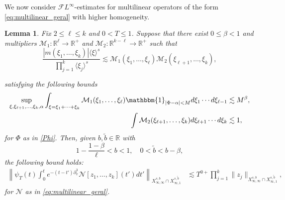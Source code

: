 \documentclass[a4paper,
11pt,  reqno]{amsart}
\newcommand{\jap}[1]{\langle #1 \rangle}
\newcommand{\5}{\textup{V}}
\newcommand{\noi}{\noindent}
\newcommand{\FL}{\mathcal{F} L}
\newcommand{\les}{\lesssim}
\newcommand{\wt}{\widetilde}
\newtheorem{lemma}[theorem]{Lemma}
\theoremstyle{remark}
\newcommand{\R}{\mathbb{R}}
\renewcommand{\l}{\ell}
\numberwithin{equation}{section}
\numberwithin{theorem}{section}
\newcommand{\Ncal}{\mathcal{N}}
\begin{document}
        
		We now consider $\FL^{\infty}$-estimates for multilinear operators of the form \eqref{eq:multilinear_geral} with higher homogeneity.
		
		\begin{lemma}\label{lem:reduction_fre_kge3}
			Fix $2\le \ell\le k$ and $0<T \le 1$. Suppose that there exist $0\le \beta<1$ and multipliers $\mathcal{M}_1:\R^\l \to \R^+$ and $\mathcal{M}_2:\R^{k-\ell}\to \R^+$ such that
			\begin{equation}
				\frac{|m(\xi_1, \ldots, \xi_k)|\jap{\xi}^s}{\prod_{j=1}^k\jap{\xi_j}^s} \lesssim \mathcal{M}_1(\xi_1,\dots, \xi_{\l})\mathcal{M}_2(\xi_{\ell+1},\dots, \xi_{{k}}),
			\end{equation}
            

            \noi 
            satisfying the following bounds
            \begin{align}
                \sup_{\xi, \xi_{\ell+1},\dots , \xi_{k},\alpha} \int_{\xi=\xi_1 + \cdots + \xi_k} \mathcal{M}_1(\xi_1,\dots,\xi_\l) \mathbbm{1}_{|\Phi-\alpha|<M} d\xi_1\cdots d\xi_{\ell-1} &
                \lesssim  
                M^\beta
                 \label{fre_kge3}, 
                 \\
                 \int \mathcal{M}_2(\xi_{\ell+1},\ldots, \xi_{{k}}) d\xi_{\ell+1}\cdots d\xi_k
                &
                \les 1,
                \label{fre_kge32}
            \end{align}
            for $\Phi$ as in \eqref{Phi}. 
            Then, given $b,\wt b\in \R$ with
            $$
            1-\frac{1-\beta}{\ell}<b<1,\quad 0<\wt{b}<b-\beta, 
            $$
            the following  bound holds:
			\begin{align}\label{frek}
				\left\|\psi_T (t)\int_0^te^{-(t-t')\partial_x^3}\Ncal[z_1,\dots, z_k](t')dt' \right\|_{X^{s,b}_{\infty, \infty}\cap X^{s,\wt{b}}_{\infty, 1}} & \les T^{0+}\prod_{j=1}^k\|z_j\|_{X^{s,b}_{\infty, \infty} \cap X^{s,\wt{b}}_{\infty,1}}
                , 
			\end{align}
			for $\Ncal$ as in \eqref{eq:multilinear_geral}.
		\end{lemma}

        
       
		
		
\end{document}
